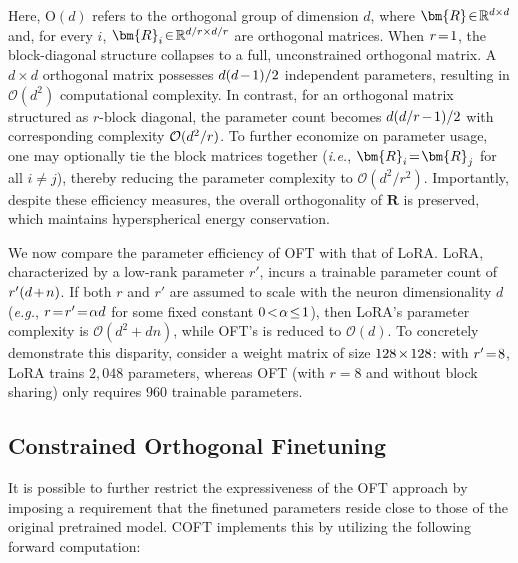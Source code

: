 Here, $\text{O}(d)$ refers to the orthogonal group of dimension $d$, where $\thickmuskip=2mu \medmuskip=2mu \bm{R}\in\mathbb{R}^{d\times d}$ and, for every $i$, $\thickmuskip=2mu \medmuskip=2mu \bm{R}_i\in\mathbb{R}^{d/r\times d/r}$ are orthogonal matrices. When $\thickmuskip=2mu \medmuskip=2mu r=1$, the block-diagonal structure collapses to a full, unconstrained orthogonal matrix. A $d\times d$ orthogonal matrix possesses $\thickmuskip=2mu \medmuskip=2mu d(d-1)/2$ independent parameters, resulting in $\mathcal{O}(d^2)$ computational complexity. In contrast, for an orthogonal matrix structured as $r$-block diagonal, the parameter count becomes $\thickmuskip=2mu \medmuskip=2mu d(d/r-1)/2$ with corresponding complexity $\thickmuskip=2mu \medmuskip=2mu \mathcal{O}(d^2/r)$. To further economize on parameter usage, one may optionally tie the block matrices together (\emph{i.e.}, $\thickmuskip=2mu \medmuskip=2mu\bm{R}_i=\bm{R}_j$ for all $i\neq j$), thereby reducing the parameter complexity to $\mathcal{O}(d^2/r^2)$. Importantly, despite these efficiency measures, the overall orthogonality of $\bm{R}$ is preserved, which maintains hyperspherical energy conservation.

We now compare the parameter efficiency of OFT with that of LoRA. LoRA, characterized by a low-rank parameter $r'$, incurs a trainable parameter count of $\thickmuskip=2mu \medmuskip=2mu r'(d+n)$. If both $r$ and $r'$ are assumed to scale with the neuron dimensionality $d$ (\emph{e.g.}, $\thickmuskip=2mu \medmuskip=2mu r=r'=\alpha d$ for some fixed constant $\thickmuskip=2mu \medmuskip=2mu 0<\alpha\leq 1$), then LoRA’s parameter complexity is $\mathcal{O}(d^2+dn)$, while OFT’s is reduced to $\mathcal{O}(d)$. To concretely demonstrate this disparity, consider a weight matrix of size $\thickmuskip=2mu \medmuskip=2mu 128\times 128$: with $\thickmuskip=2mu \medmuskip=2mu r'=8$, LoRA trains $2,048$ parameters, whereas OFT (with $r=8$ and without block sharing) only requires $960$ trainable parameters.

\subsection{Constrained Orthogonal Finetuning}

It is possible to further restrict the expressiveness of the OFT approach by imposing a requirement that the finetuned parameters reside close to those of the original pretrained model. COFT implements this by utilizing the following forward computation:

